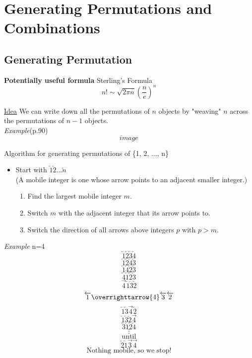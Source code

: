 \documentclass[12pt]{article}
\begin{document}
\setcounter{section}{3}



\section{Generating Permutations and Combinations}
\subsection{Generating Permutation}
{\bf Potentially useful formula} Sterling's Formula
$$n!\sim \sqrt{2\pi n}\left(\frac{n}{e}\right)^n$$

\underline{Idea} We can write down all the permutations of $n$ objects by "weaving" $n$ across the permutations of $n-1$ objects.\\

{\sl Example}(p.90)
$$image$$

Algorithm for generating permutations of \{1, 2, ..., n\}
\begin{itemize}
    \item Start with $\overleftarrow{1} \overleftarrow{2} \ldots \overleftarrow{n}$\\
    (A mobile integer is one whose arrow points to an adjacent smaller integer.)
    
    \begin{enumerate}
        \item Find the largest mobile integer $m$. 
        \item Switch $m$ with the adjacent integer that its arrow points to.
        \item Switch the direction of all arrows above integers $p$ with $p>m$.
    \end{enumerate}
\end{itemize}

{\sl Example} n=4
$$\overleftarrow{1}\overleftarrow{2}\overleftarrow{3}\overleftarrow{4}$$
$$\overleftarrow{1}\overleftarrow{2}\overleftarrow{4}\overleftarrow{3}$$
$$\overleftarrow{1}\overleftarrow{4}\overleftarrow{2}\overleftarrow{3}$$
$$\overleftarrow{4}\overleftarrow{1}\overleftarrow{2}\overleftarrow{3}$$
$$\overrightarrow{4}\overleftarrow{1}\overleftarrow{3}\overleftarrow{2}$$
$$\overleftarrow{1}\overrighttarrow{4}\overleftarrow{3}\overleftarrow{2}$$
$$\overleftarrow{1}\overleftarrow{3}\overrightarrow{4}\overleftarrow{2}$$
$$\overleftarrow{1}\overleftarrow{3}\overleftarrow{2}\overrightarrow{4}$$
$$\overleftarrow{3}\overleftarrow{1}\overleftarrow{2}\overleftarrow{4}$$
$$\vdots$$
$$\text{until}$$
$$\overleftarrow{2}\overleftarrow{1}\overrightarrow{3}\overrightarrow{4}$$
$$\text{Nothing mobile, so we stop!}$$
\end{document}

